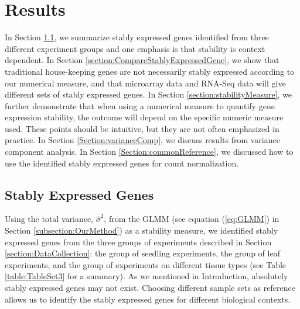 \documentclass[letterpaper,12pt]{article}
\begin{document}


\section{Results} \label{section:Results}
In Section \ref{section:stablyExpressedGene}, we summarize stably expressed genes identified from three
different experiment groups and one emphasis is that stability is
context dependent. In Section \ref{section:CompareStablyExpressedGene}, we show that traditional house-keeping
genes are not necessarily stably expressed according to our numerical measure, 
and that microarray data and RNA-Seq data will give different sets of stably
expressed genes.  In Section \ref{section:stabilityMeasure}, we further demonstrate that when using a
numerical measure to quantify gene expression stability, the outcome will
depend on the specific numeric measure used.  These points should be
intuitive, but they are not often emphasized in practice.  In Section
\ref{Section:varianceComp}, we discuss results from variance component analysis. In Section
\ref{Section:commonReference}, we discussed how to use the identified stably
expressed genes for count normalization.

\subsection{Stably Expressed Genes}\label{section:stablyExpressedGene}
Using the total variance, $\hat\sigma^2$, from the GLMM (see
equation (\ref{eq:GLMM}) in Section \ref{subsection:OurMethod}) as a
stability measure, we identified stably expressed genes from the three groups
of experiments described in Section \ref{section:DataCollection}: the group of
seedling experiments, the group of leaf experiments, and the group of
experiments on different tissue types (see Table \ref{table:TableSet3} for a
summary).
As we mentioned in Introduction, absolutely stably expressed genes may not
exist.  Choosing different sample sets as reference allows us to identify the
stably expressed genes for different biological contexts.
\end{document}
